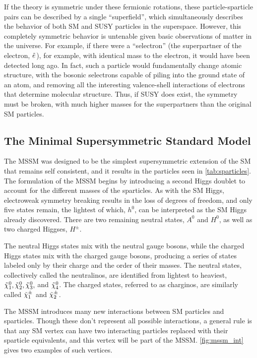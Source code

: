 If the theory is symmetric under these fermionic rotations, these particle-sparticle pairs can be described by a single ``superfield'', which simultaneously describes the behavior of both \ac{SM} and \ac{SUSY} particles in the superspace. However, this completely symmetric behavior is untenable given basic observations of matter in the universe. For example, if there were a ``selectron'' (the superpartner of the electron, $\sle$), for example, with identical mass to the electron, it would have been detected long ago. In fact, such a particle would fundamentally change atomic structure, with the bosonic selectrons capable of piling into the ground state of an atom, and removing all the interesting valence-shell interactions of electrons that determine molecular structure. Thus, if \ac{SUSY} does exist, the symmetry must be broken, with much higher masses for the superpartners than the original \ac{SM} particles. 

\subsection{The Minimal Supersymmetric Standard Model}

The \ac{MSSM} was designed to be the simplest supersymmetric extension of the \ac{SM} that remains self consistent, and it results in the particles seen in \autoref{tab:sparticles}\cite{Martin:1997ns}. The formulation of the \ac{MSSM} begins by introducing a second Higgs doublet to account for the different masses of the sparticles. As with the \ac{SM} Higgs, electroweak symmetry breaking results in the loss of degrees of freedom, and only five states remain, the lightest of which, $h^0$, can be interpreted as the \ac{SM} Higgs already discovered. There are two remaining neutral states, $A^0$ and $H^0$, as well as two charged Higgses, $H^\pm$. 

The neutral Higgs states mix with the neutral gauge bosons, while the charged Higgs states mix with the charged gauge bosons, producing a series of states labeled only by their charge and the order of their masses. The neutral states, collectively called the neutralinos, are identified from lightest to heaviest, $\No[1], \No[2], \No[3],$ and $\No[4]$. The charged states, referred to as charginos, are similarly called $\Co[1]$ and $\Co[2]$.

The \ac{MSSM} introduces many new interactions between \ac{SM} particles and sparticles. Though these don't represent all possible interactions, a general rule is that any \ac{SM} vertex can have two interacting particles replaced with their sparticle equivalents, and this vertex will be part of the \ac{MSSM}. \autoref{fig:mssm_int} gives two examples of such vertices. 

